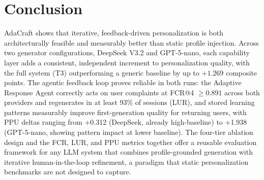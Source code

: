 \documentclass[conference]{IEEEtran}
\begin{document}
\section{Conclusion}

AdaCraft shows that iterative, feedback-driven personalization is both architecturally feasible and measurably better than static profile injection. Across two generator configurations, DeepSeek V3.2 and GPT-5-nano, each capability layer adds a consistent, independent increment to personalization quality, with the full system (T3) outperforming a generic baseline by up to $+1.269$ composite points. The agentic feedback loop proves reliable in both runs: the Adaptive Response Agent correctly acts on user complaints at FCR@4 $\geq 0.891$ across both providers and regenerates in at least 93\% of sessions (LUR), and stored learning patterns measurably improve first-generation quality for returning users, with PPU deltas ranging from +0.312 (DeepSeek, already high-baseline) to +1.938 (GPT-5-nano, showing pattern impact at lower baseline). The four-tier ablation design and the FCR, LUR, and PPU metrics together offer a reusable evaluation framework for any LLM system that combines profile-grounded generation with iterative human-in-the-loop refinement, a paradigm that static personalization benchmarks are not designed to capture.

\end{document}
